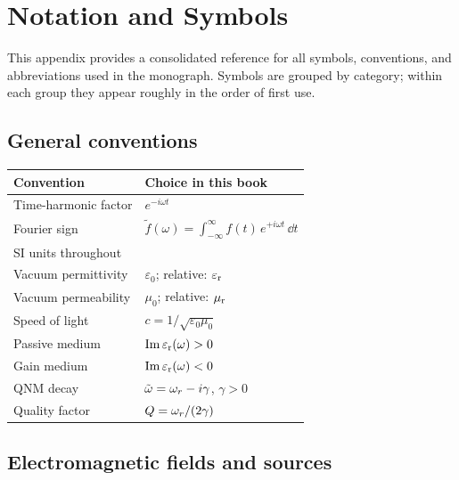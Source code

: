 \chapter{Notation and Symbols}
\label{app:notation}

This appendix provides a consolidated reference for all symbols,
conventions, and abbreviations used in the monograph. Symbols are
grouped by category; within each group they appear roughly in the order
of first use.


\section{General conventions}
\label{sec:conventions}

\begin{center}
\begin{tabular}{ll}
\toprule
Convention & Choice in this book \\
\midrule
Time-harmonic factor & $e^{-i\omega t}$ \\
Fourier sign & $\tilde{f}(\omega)
 = \int_{-\infty}^{\infty} f(t)\,e^{+i\omega t}\,\dd t$ \\
SI units throughout & \\
Vacuum permittivity & $\varepsilon_0$; relative: $\varepsilon_{\mathrm{r}}$ \\
Vacuum permeability & $\mu_0$; relative: $\mu_{\mathrm{r}}$ \\
Speed of light & $c = 1/\sqrt{\varepsilon_0\mu_0}$ \\
Passive medium & $\operatorname{Im}\varepsilon_{\mathrm{r}}(\omega) > 0$ \\
Gain medium & $\operatorname{Im}\varepsilon_{\mathrm{r}}(\omega) < 0$ \\
QNM decay & $\tilde{\omega} = \omega_r - i\gamma$, $\gamma > 0$ \\
Quality factor & $Q = \omega_r / (2\gamma)$ \\
\bottomrule
\end{tabular}
\end{center}


\section{Electromagnetic fields and sources}
\label{sec:em-symbols}

